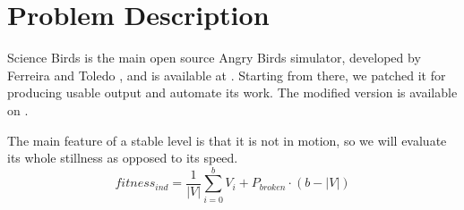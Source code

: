 \documentclass[sigconf]{acmart}
\begin{document}
\section{Problem Description}
\label{sec:angry}

Science Birds is the main open source Angry Birds
simulator, developed by  Ferreira and Toledo
\cite{ferreira2014search}, and is available at \cite{sciencebirds}. 
Starting from there, we patched it for producing usable output 
and automate its work. The modified 
version is available on \cite{sciencebirds-adapt}.



The main feature of a stable level is that it 
is not in motion, so we will evaluate its whole stillness as 
opposed to its speed. %
$$fitness_{ind} = \frac{1}{|V|}\sum_{i=0}^{b}{V_i} + P_{broken}\cdot(b-|V|)$$
\end{document}
